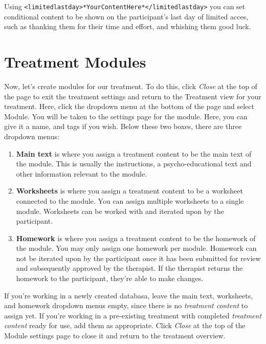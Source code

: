 \documentclass[
]{book}
\providecommand{\tightlist}{%
  \setlength{\itemsep}{0pt}\setlength{\parskip}{0pt}}
\begin{document}
Using \texttt{\textless{}limitedlastday\textgreater{}*YourContentHere*\textless{}/limitedlastday\textgreater{}} you can set conditional content to be shown on the participant's last day of limited acces, such as thanking them for their time and effort, and whishing them good luck.

\section{Treatment Modules}\label{treatment-modules}

Now, let's create modules for our treatment. To do this, click \emph{Close} at the top of the page to exit the treatment settings and return to the Treatment view for your treatment. Here, click the dropdown menu at the bottom of the page and select Module. You will be taken to the settings page for the module. Here, you can give it a name, and tags if you wish. Below these two boxes, there are three dropdown menus:

\begin{enumerate}
\def\labelenumi{\arabic{enumi}.}
\tightlist
\item
  \textbf{Main text} is where you assign a treatment content to be the main text of the module. This is usually the instructions, a psycho-educational text and other information relevant to the module.
\item
  \textbf{Worksheets} is where you assign a treatment content to be a worksheet connected to the module. You can assign multiple worksheets to a single module. Worksheets can be worked with and iterated upon by the participant.
\item
  \textbf{Homework} is where you assign a treatment content to be the homework of the module. You may only assign one homework per module. Homework can not be iterated upon by the participant once it has been submitted for review and subsequently approved by the therapist. If the therapist returns the homework to the participant, they're able to make changes.
\end{enumerate}

If you're working in a newly created databasa, leave the main text, worksheets, and homework dropdown menus empty, since there is no \emph{treatment content} to assign yet.
If you're working in a pre-existing treatment with completed \emph{treatment content} ready for use, add them as appropriate.
Click \emph{Close} at the top of the Module settings page to close it and return to the treatment overview.
\end{document}
